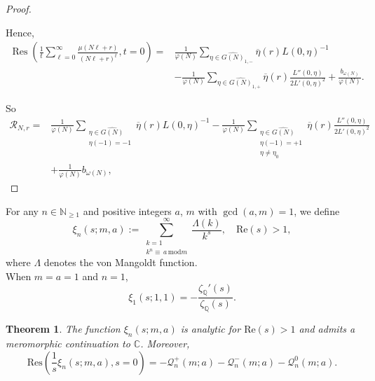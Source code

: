 \documentclass[12pt]{amsart}
\newtheorem{theorem}{Theorem}[section]
\newcommand{\Q}{\mathbb{Q}}
\begin{document}
\begin{proof}
\begin{enumerate}[label= \roman*)]
Hence,
\[
\begin{split}
\operatorname{Res} \left( \frac{1}{t} \sum_{\ell=0}^\infty \frac{\mu(N\ell + r)}{(N\ell + r)^t},t=0 \right)
=& \frac{1}{\varphi(N)} \sum_{\eta \in \widehat{G(N)}_{1,-}} \overline{\eta}(r) L(0,\eta)^{-1}\\
&- \frac{1}{\varphi(N)} \sum_{\eta \in \widehat{G(N)}_{1,+}} \overline{\eta}(r) \frac{L''(0,\eta)}{2 L'(0,\eta)^2}
+ \frac{b_{\omega(N)}}{\varphi(N)}.
\end{split}
\]
\end{enumerate}
So
\begin{equation*}
\begin{split}
\mathscr{R}_{N,r} = 
&\frac{1}{\varphi(N)} \sum_{\substack{\eta \in \widehat{G(N)} \\ \eta(-1) = -1}} \overline{\eta}(r)  L(0,\eta)^{-1} - \frac{1}{\varphi(N)} \sum_{\substack{\eta \in \widehat{G(N)} \\ \eta(-1) = +1 \\ \eta \ne \eta_0}} \overline{\eta}(r) \frac{L''(0,\eta)}{2 L'(0,\eta)^2} \\
&+ \frac{1}{\varphi(N)} b_{\omega(N)},
\end{split}
\end{equation*}


\end{proof}




 
 
 
 
 



For any $n \in \mathbb{N}_{\geq 1}$ and positive integers $a$, $m$ with $\gcd(a,m) = 1$, we define
\begin{equation*}
\xi_n(s; m, a) := \sum_{\substack{k=1 \\ k^n \equiv\, a\, \mathrm{mod}{m}}}^\infty \frac{\Lambda(k)}{k^s}, \quad \mathrm{Re}(s) > 1,
\end{equation*}
where $\Lambda$ denotes the von Mangoldt function.\\



When $m = a = 1$ and $n = 1$,
\begin{equation*}
\xi_1(s; 1, 1) = -\frac{\zeta_\Q'(s)}{\zeta_\Q(s)}.
\end{equation*}




\begin{theorem}
The function $\xi_n(s; m, a)$ is analytic for $\mathrm{Re}(s) > 1$ and admits a meromorphic continuation to $\mathbb{C}$. Moreover,
\begin{equation*}
\mathrm{Res}\left( \frac{1}{s} \xi_n(s; m, a), s=0 \right)
= -\mathscr{Q}_n^+(m; a) - \mathscr{Q}_n^-(m; a) - \mathscr{Q}_n^0(m; a).
\end{equation*}
\end{theorem}
\end{document}
